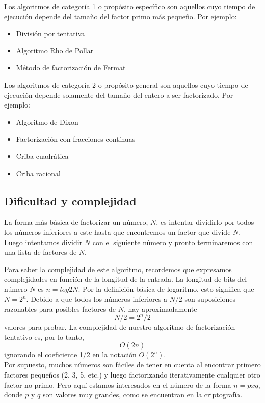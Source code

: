\documentclass{article}
\begin{document}
Los algoritmos de categoría 1 o propósito específico son aquellos cuyo tiempo de
ejecución depende del tamaño del factor primo más pequeño. Por ejemplo:

\begin{itemize}
    \item División por tentativa
    \item Algoritmo Rho de Pollar
    \item Método de factorización de Fermat
\end{itemize}

Los algoritmos de categoría 2 o propósito general son aquellos cuyo tiempo de
ejecución depende solamente del tamaño del entero a ser factorizado. Por ejemplo:

\begin{itemize}
    \item Algoritmo de Dixon
    \item Factorización con fracciones contínuas
    \item Criba cuadrática
    \item Criba racional
\end{itemize}

\subsection{Dificultad y complejidad}


La forma más básica de factorizar un número, $N$, es intentar dividirlo por
todos los números inferiores a este hasta que encontremos un factor que divide
$N$. Luego intentamos dividir $N$ con el siguiente número y pronto terminaremos
con una lista de factores de $N$.

Para saber la complejidad de este algoritmo, recordemos que expresamos
complejidades en función de la longitud de la entrada. La longitud de bits del
número $N$ es $n= log2 N$. Por la definición básica de logaritmo, esto
significa que $N = 2^n$. Debido a que todos los números inferiores a $N/2$ son
suposiciones razonables para posibles factores de $N$, hay aproximadamente $$N/2
= 2^n/2$$ valores para probar. La complejidad de nuestro algoritmo de
factorización tentativo es, por lo tanto, $$ O(2n) $$ ignorando el coeficiente
1/2 en la notación $ O(2^n)$. \\

Por supuesto, muchos números son fáciles de tener en cuenta al encontrar primero
factores pequeños (2, 3, 5, etc.) y luego factorizando iterativamente cualquier
otro factor no primo. Pero aquí estamos interesados en el número de la forma $n
= p x q$, donde $p$ y $q$ son valores muy grandes, como se encuentran en la
criptografía.
\end{document}
